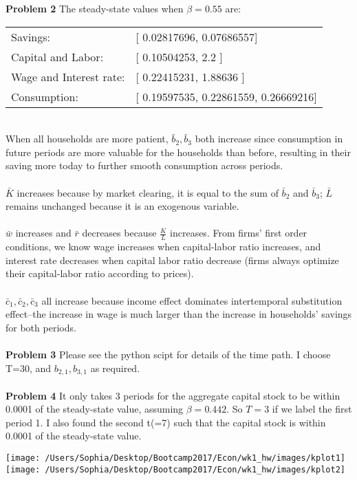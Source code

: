 \documentclass[letterpaper,12pt]{article}
\theoremstyle{definition}
\begin{document}
\noindent\textbf{Problem 2}
The steady-state values when $\beta = 0.55$ are: \\
\begin{table}[htbp]
\begin{tabular}{ll}
Savings:&[ 0.02817696,  0.07686557] \\
Capital and Labor:&[ 0.10504253,  2.2       ] \\
Wage and Interest rate:&[ 0.22415231,  1.88636   ] \\
Consumption:&[ 0.19597535,  0.22861559,  0.26669216]\\
\end{tabular}
\end{table}
\\
When all households are more patient, $\bar{b}_2, \bar{b}_3$ both increase since consumption in future periods are more valuable for the households than before, resulting in their saving more today to further smooth consumption across periods.\\
\\
$\bar{K}$ increases because by market clearing, it is equal to the sum of $\bar{b}_2$ and $\bar{b}_3$; $\bar{L}$ remains unchanged because it is an exogenous variable.\\
\\
$\bar{w}$ increases and $\bar{r}$ decreases because $\frac{K}{L}$ increases. From firms' first order conditions, we know wage increases when capital-labor ratio increases, and interest rate decreases when capital labor ratio decrease (firms always optimize their capital-labor ratio according to prices).\\
\\
$\bar{c}_1, \bar{c}_2, \bar{c}_3$ all increase because income effect dominates intertemporal substitution effect--the increase in wage is much larger than the increase in households' savings for both periods.
\\
\\
\noindent\textbf{Problem 3}
Please see the python scipt for details of the time path. I choose T=30, and $b_{2,1}, b_{3,1}$ as required.
\\
\\
\noindent\textbf{Problem 4}
It only takes 3 periods for the aggregate capital stock to be within 0.0001 of the steady-state value, assuming $\beta = 0.442$. So $T=3$ if we label the first period 1. I also found the second t(=7) such that the capital stock is within 0.0001 of the steady-state value.
\begin{center}
\texttt{[image: /Users/Sophia/Desktop/Bootcamp2017/Econ/wk1\_hw/images/kplot1]}
\texttt{[image: /Users/Sophia/Desktop/Bootcamp2017/Econ/wk1\_hw/images/kplot2]}
\end{center}
\end{document}
